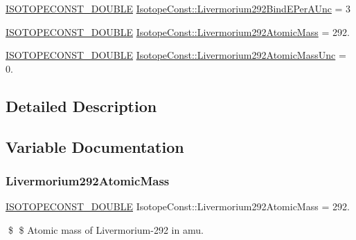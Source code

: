 \begin{DoxyCompactItemize}
\item 
\mbox{\hyperlink{group___isotope_const-_macros_ga8f45a7272ce02c0b4c65c44636ed719a}{I\+S\+O\+T\+O\+P\+E\+C\+O\+N\+S\+T\+\_\+\+D\+O\+U\+B\+LE}} \mbox{\hyperlink{group___isotope_const-_livermorium-_lv292_gac74f3e8818206f3324a5f35e4f774be3}{Isotope\+Const\+::\+Livermorium292\+Bind\+E\+Per\+A\+Unc}} = 3
\item 
\mbox{\hyperlink{group___isotope_const-_macros_ga8f45a7272ce02c0b4c65c44636ed719a}{I\+S\+O\+T\+O\+P\+E\+C\+O\+N\+S\+T\+\_\+\+D\+O\+U\+B\+LE}} \mbox{\hyperlink{group___isotope_const-_livermorium-_lv292_gabf63517b416234f41bc9681975e7057f}{Isotope\+Const\+::\+Livermorium292\+Atomic\+Mass}} = 292.
\item 
\mbox{\hyperlink{group___isotope_const-_macros_ga8f45a7272ce02c0b4c65c44636ed719a}{I\+S\+O\+T\+O\+P\+E\+C\+O\+N\+S\+T\+\_\+\+D\+O\+U\+B\+LE}} \mbox{\hyperlink{group___isotope_const-_livermorium-_lv292_ga1e291a08122c703cc12cb1c38a4ac06a}{Isotope\+Const\+::\+Livermorium292\+Atomic\+Mass\+Unc}} = 0.
\end{DoxyCompactItemize}


\subsection{Detailed Description}


\subsection{Variable Documentation}
\mbox{\label{group___isotope_const-_livermorium-_lv292_gabf63517b416234f41bc9681975e7057f}} 
\subsubsection{\texorpdfstring{Livermorium292\+Atomic\+Mass}{Livermorium292AtomicMass}}
{\footnotesize\ttfamily \mbox{\hyperlink{group___isotope_const-_macros_ga8f45a7272ce02c0b4c65c44636ed719a}{I\+S\+O\+T\+O\+P\+E\+C\+O\+N\+S\+T\+\_\+\+D\+O\+U\+B\+LE}} Isotope\+Const\+::\+Livermorium292\+Atomic\+Mass = 292.}

\$ \$ Atomic mass of Livermorium-\/292 in amu. \mbox{\label{group___isotope_const-_livermorium-_lv292_ga1e291a08122c703cc12cb1c38a4ac06a}} 
